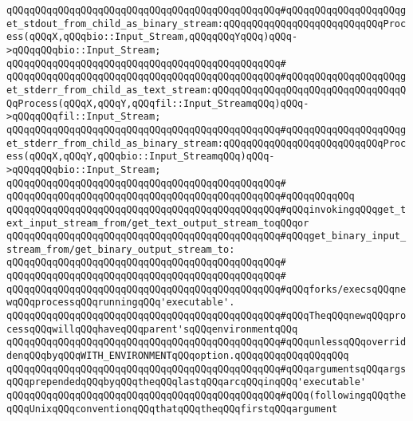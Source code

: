\verb|qQQqqQQqqQQqqQQqqQQqqQQqqQQqqQQqqQQqqQQqqQQqqQQq#qQQqqQQqqQQqqQQqqQQqget_stdout_from_child_as_binary_stream:qQQqqQQqqQQqqQQqqQQqqQQqqQQqProcess(qQQqX,qQQqbio::Input_Stream,qQQqqQQqYqQQq)qQQq->qQQqqQQqbio::Input_Stream;|\newline
\verb|qQQqqQQqqQQqqQQqqQQqqQQqqQQqqQQqqQQqqQQqqQQqqQQq#|\newline
\verb|qQQqqQQqqQQqqQQqqQQqqQQqqQQqqQQqqQQqqQQqqQQqqQQq#qQQqqQQqqQQqqQQqqQQqget_stderr_from_child_as_text_stream:qQQqqQQqqQQqqQQqqQQqqQQqqQQqqQQqqQQqProcess(qQQqX,qQQqY,qQQqfil::Input_StreamqQQq)qQQq->qQQqqQQqfil::Input_Stream;|\newline
\verb|qQQqqQQqqQQqqQQqqQQqqQQqqQQqqQQqqQQqqQQqqQQqqQQq#qQQqqQQqqQQqqQQqqQQqget_stderr_from_child_as_binary_stream:qQQqqQQqqQQqqQQqqQQqqQQqqQQqProcess(qQQqX,qQQqY,qQQqbio::Input_StreamqQQq)qQQq->qQQqqQQqbio::Input_Stream;|\newline
\verb|qQQqqQQqqQQqqQQqqQQqqQQqqQQqqQQqqQQqqQQqqQQqqQQq#|\newline
\verb|qQQqqQQqqQQqqQQqqQQqqQQqqQQqqQQqqQQqqQQqqQQqqQQq#qQQqqQQqqQQq|\newline
\verb|qQQqqQQqqQQqqQQqqQQqqQQqqQQqqQQqqQQqqQQqqQQqqQQq#qQQqinvokingqQQqget_text_input_stream_from/get_text_output_stream_toqQQqor|\newline
\verb|qQQqqQQqqQQqqQQqqQQqqQQqqQQqqQQqqQQqqQQqqQQqqQQq#qQQqget_binary_input_stream_from/get_binary_output_stream_to:|\newline
\verb|qQQqqQQqqQQqqQQqqQQqqQQqqQQqqQQqqQQqqQQqqQQqqQQq#|\newline
\verb|qQQqqQQqqQQqqQQqqQQqqQQqqQQqqQQqqQQqqQQqqQQqqQQq#|\newline
\verb|qQQqqQQqqQQqqQQqqQQqqQQqqQQqqQQqqQQqqQQqqQQqqQQq#qQQqforks/execsqQQqnewqQQqprocessqQQqrunningqQQq'executable'.|\newline
\verb|qQQqqQQqqQQqqQQqqQQqqQQqqQQqqQQqqQQqqQQqqQQqqQQq#qQQqTheqQQqnewqQQqprocessqQQqwillqQQqhaveqQQqparent'sqQQqenvironmentqQQq|\newline
\verb|qQQqqQQqqQQqqQQqqQQqqQQqqQQqqQQqqQQqqQQqqQQqqQQq#qQQqunlessqQQqoverriddenqQQqbyqQQqWITH_ENVIRONMENTqQQqoption.qQQqqQQqqQQqqQQqqQQq|\newline
\verb|qQQqqQQqqQQqqQQqqQQqqQQqqQQqqQQqqQQqqQQqqQQqqQQq#qQQqargumentsqQQqargsqQQqprependedqQQqbyqQQqtheqQQqlastqQQqarcqQQqinqQQq'executable'|\newline
\verb|qQQqqQQqqQQqqQQqqQQqqQQqqQQqqQQqqQQqqQQqqQQqqQQq#qQQq(followingqQQqtheqQQqUnixqQQqconventionqQQqthatqQQqtheqQQqfirstqQQqargument|\newline

